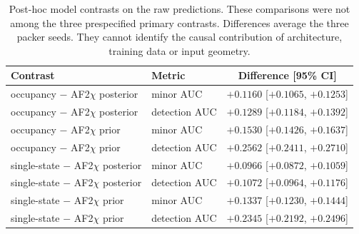 \documentclass[10pt,a4paper]{article}
\begin{document}
\begin{table}[!htbp]
\centering
\caption{Post-hoc model contrasts on the raw predictions. These comparisons were not among the three prespecified primary contrasts. Differences average the three packer seeds. They cannot identify the causal contribution of architecture, training data or input geometry.}
\label{tab:afposthoc}
\small\setlength{\tabcolsep}{4pt}
\begin{tabular}{@{}llc@{}}
\toprule
Contrast & Metric & Difference [95\% CI] \\
\midrule
occupancy $-$ AF2$\chi$ posterior & minor AUC & $+0.1160$ [$+0.1065$, $+0.1253$] \\
occupancy $-$ AF2$\chi$ posterior & detection AUC & $+0.1289$ [$+0.1184$, $+0.1392$] \\
occupancy $-$ AF2$\chi$ prior & minor AUC & $+0.1530$ [$+0.1426$, $+0.1637$] \\
occupancy $-$ AF2$\chi$ prior & detection AUC & $+0.2562$ [$+0.2411$, $+0.2710$] \\
single-state $-$ AF2$\chi$ posterior & minor AUC & $+0.0966$ [$+0.0872$, $+0.1059$] \\
single-state $-$ AF2$\chi$ posterior & detection AUC & $+0.1072$ [$+0.0964$, $+0.1176$] \\
single-state $-$ AF2$\chi$ prior & minor AUC & $+0.1337$ [$+0.1230$, $+0.1444$] \\
single-state $-$ AF2$\chi$ prior & detection AUC & $+0.2345$ [$+0.2192$, $+0.2496$] \\
\bottomrule
\end{tabular}
\end{table}
\end{document}
